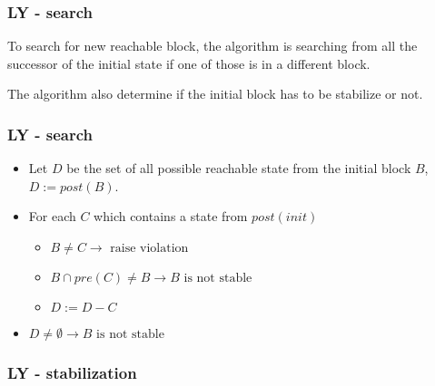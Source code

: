\documentclass[11pt,handout]{beamer}
\begin{document}
\begin{frame}
  \frametitle{LY - search}
  To search for new reachable block, the algorithm is searching from all the
  successor of the initial state if one of those is in a different block.

  \pause
  \vspace*{1cm}

  The algorithm also determine if the initial block has to be stabilize or not.
\end{frame}

\begin{frame}[fragile]
  \frametitle{LY - search}
  \begin{itemize}
  \item Let $D$ be the set of all possible reachable state from the initial
    block $B$, $D := post(B)$.
  \item For each $C$ which contains a state from $post(init)$
    \begin{itemize}
    \item $B \neq C \to \text{ raise violation}$
    \item $B \cap pre(C) \neq B \to B \text{ is not stable}$
    \item $D := D - C$
    \end{itemize}
    \item $D \neq \emptyset \to B \text{ is not stable}$
  \end{itemize}
\end{frame}

\begin{frame}[fragile]
  \frametitle{LY - stabilization}
  \begin{algorithmic}[1]
    \EndWhile
  \end{algorithmic}
\end{frame}


\end{document}
